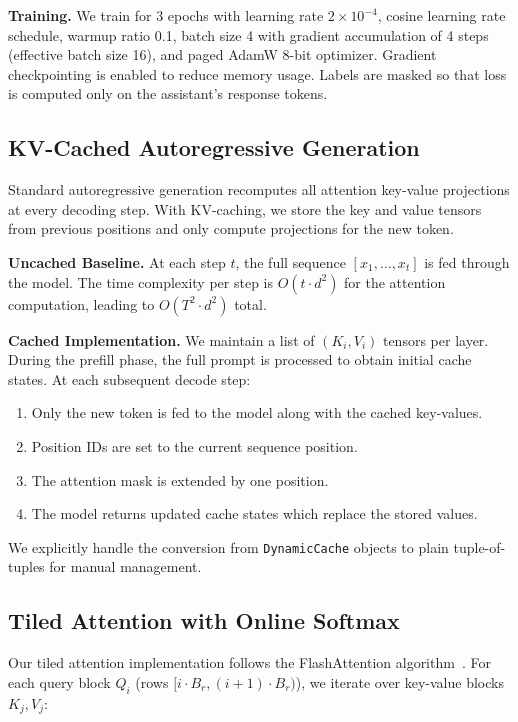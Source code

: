 \documentclass[conference]{IEEEtran}
\begin{document}
\textbf{Training.} We train for 3 epochs with learning rate $2 \times 10^{-4}$, cosine learning rate schedule, warmup ratio 0.1, batch size 4 with gradient accumulation of 4 steps (effective batch size 16), and paged AdamW 8-bit optimizer. Gradient checkpointing is enabled to reduce memory usage. Labels are masked so that loss is computed only on the assistant's response tokens.

\subsection{KV-Cached Autoregressive Generation}

Standard autoregressive generation recomputes all attention key-value projections at every decoding step. With KV-caching, we store the key and value tensors from previous positions and only compute projections for the new token.

\textbf{Uncached Baseline.} At each step $t$, the full sequence $[x_1, \ldots, x_t]$ is fed through the model. The time complexity per step is $O(t \cdot d^2)$ for the attention computation, leading to $O(T^2 \cdot d^2)$ total.

\textbf{Cached Implementation.} We maintain a list of $(K_i, V_i)$ tensors per layer. During the prefill phase, the full prompt is processed to obtain initial cache states. At each subsequent decode step:
\begin{enumerate}
\item Only the new token is fed to the model along with the cached key-values.
\item Position IDs are set to the current sequence position.
\item The attention mask is extended by one position.
\item The model returns updated cache states which replace the stored values.
\end{enumerate}

We explicitly handle the conversion from \texttt{DynamicCache} objects to plain tuple-of-tuples for manual management.

\subsection{Tiled Attention with Online Softmax}

Our tiled attention implementation follows the FlashAttention algorithm~\cite{dao2022flashattention}. For each query block $Q_i$ (rows $[i \cdot B_r, (i+1) \cdot B_r)$), we iterate over key-value blocks $K_j, V_j$:
\end{document}
